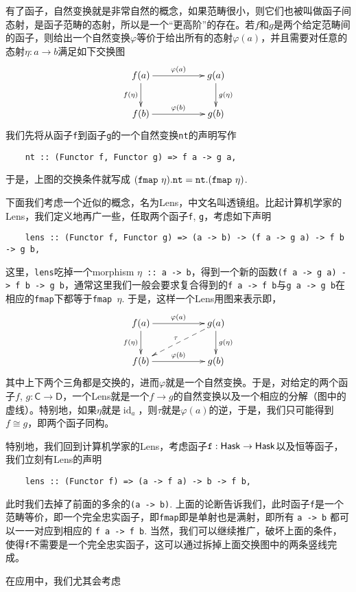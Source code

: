 \documentclass[10pt]{article}
\begin{document}
有了函子，自然变换就是非常自然的概念，如果范畴很小，则它们也被叫做函子间态射，是函子范畴的态射，所以是一个“更高阶”的存在。若$f$和$g$是两个给定范畴间的函子，则给出一个自然变换$\varphi$等价于给出所有的态射$\varphi(a)$，并且需要对任意的态射$\eta:a\to b$满足如下交换图
\[
\begin{xy}
	\xymatrix{
		f(a)\ar[rr]^{\varphi(a)} \ar[d]_{f(\eta)}&&g(a) \ar[d]^{g(\eta)}\\
		f(b)\ar[rr]^{\varphi(b)}&&g(b)
	}
\end{xy}
\]
我们先将从函子{\tt f}到函子{\tt g}的一个自然变换{\tt nt}的声明写作
\begin{lstlisting}
    nt :: (Functor f, Functor g) => f a -> g a,
\end{lstlisting}
于是，上图的交换条件就写成 $\tt (fmap~\eta).nt = nt.(fmap~\eta)$. 

下面我们考虑一个近似的概念，名为Lens，中文名叫透镜组。比起计算机学家的Lens，我们定义地再广一些，任取两个函子{\tt f}, {\tt g}，考虑如下声明
\begin{lstlisting}
    lens :: (Functor f, Functor g) => (a -> b) -> (f a -> g a) -> f b -> g b,
\end{lstlisting}
这里，{\tt lens}吃掉一个morphism {\tt$\eta$~::~a -> b}，得到一个新的函数{\tt (f a -> g a) -> f b -> g b}，通常这里我们一般会要求复合得到的{\tt f a -> f b}与{\tt g a -> g b}在相应的{\tt fmap}下都等于{\tt fmap $\eta$}. 于是，这样一个Lens用图来表示即，
\[ 
\begin{xy}
	\xymatrix{
		f(a)\ar[rr]^{\varphi(a)} \ar[d]_{f(\eta)}&&g(a) \ar[d]^{g(\eta)}\ar@{-->}[lld]_\tau \\
		f(b)\ar[rr]^{\varphi(b)}&&g(b)
	}
\end{xy}
\]
其中上下两个三角都是交换的，进而$\varphi$就是一个自然变换。于是，对给定的两个函子$f$, $g: \mathsf{C}\to \mathsf{D}$，一个Lens就是一个$f\to g$的自然变换以及一个相应的分解（图中的虚线）。特别地，如果$\eta$就是$\operatorname{id}_a$，则$\tau$就是$\varphi(a)$的逆，于是，我们只可能得到$f\cong g$，即两个函子同构。

特别地，我们回到计算机学家的Lens，考虑函子$\tt f:\mathsf{Hask}\to \mathsf{Hask}$以及恒等函子，我们立刻有Lens的声明
\begin{lstlisting}
    lens :: (Functor f) => (a -> f a) -> b -> f b,
\end{lstlisting}
此时我们去掉了前面的多余的{\tt (a -> b)}. 上面的论断告诉我们，此时函子{\tt f}是一个范畴等价，即一个完全忠实函子，即{\tt fmap}即是单射也是满射，即所有 {\tt a -> b} 都可以一一对应到相应的 {\tt f a -> f b}. 当然，我们可以继续推广，破坏上面的条件，使得{\tt f}不需要是一个完全忠实函子，这可以通过拆掉上面交换图中的两条竖线完成。

在应用中，我们尤其会考虑
\end{document}
